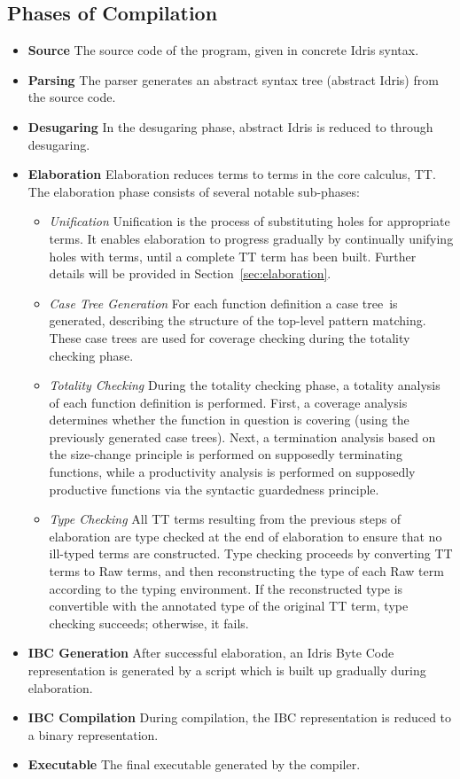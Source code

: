 \subsection{Phases of Compilation}
\begin{itemize}
\item \textbf{Source}
The source code of the program, given in concrete Idris syntax.
\item \textbf{Parsing}
The parser generates an abstract syntax tree (abstract Idris) from the source code.
\item \textbf{Desugaring}
 In the desugaring phase, abstract Idris is reduced to \IdrisM through
 desugaring.
\item \textbf{Elaboration}
Elaboration reduces \IdrisM terms to terms in the core calculus, TT. The
elaboration phase consists of several notable sub-phases:
\begin{itemize}
\item \textit{Unification}
Unification is the process of substituting holes for appropriate terms. It
enables elaboration to progress gradually by continually unifying holes with
terms, until a complete TT term has been built. Further details will be provided
in Section~\ref{sec:elaboration}.
\item \textit{Case Tree Generation}
For each function definition a case tree\,\citep{Augustsson:1985} is generated,
describing the structure of the top-level pattern matching. These case trees are
used for coverage checking during the totality checking phase.
\item \textit{Totality Checking}
During the totality checking phase, a totality analysis of each function
definition is performed. First, a coverage analysis determines whether the
function in question is covering (using the previously generated case
trees). Next, a termination analysis based on the size-change principle is
performed on supposedly terminating functions, while a productivity analysis is
performed on supposedly productive functions via the syntactic guardedness principle.
\item \textit{Type Checking}
All TT terms resulting from the previous steps of elaboration are type checked
at the end of elaboration to ensure that no ill-typed terms are
constructed. Type checking proceeds by converting TT terms to Raw terms, and
then reconstructing the type of each Raw term according to the typing
environment. If the reconstructed type is convertible with the annotated type of
the original TT term, type checking succeeds; otherwise, it fails.
\end{itemize}
\item \textbf{IBC Generation}
After successful elaboration, an Idris Byte Code representation is
generated by a script which is built up gradually during elaboration. 
\item \textbf{IBC Compilation}
During compilation, the IBC representation is reduced to a binary
representation.
\item \textbf{Executable}
The final executable generated by the compiler.
\end{itemize}
